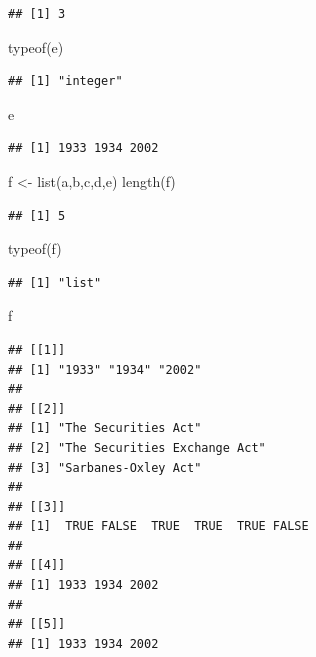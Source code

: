 \documentclass[
]{book}
\newenvironment{Shaded}{\begin{snugshade}}{\end{snugshade}}
\newcommand{\FunctionTok}[1]{\textcolor[rgb]{0.00,0.00,0.00}{#1}}
\newcommand{\NormalTok}[1]{#1}
\newcommand{\OtherTok}[1]{\textcolor[rgb]{0.56,0.35,0.01}{#1}}
\begin{document}
\begin{verbatim}
## [1] 3
\end{verbatim}

\begin{Shaded}
\begin{Highlighting}[]
\FunctionTok{typeof}\NormalTok{(e)}
\end{Highlighting}
\end{Shaded}

\begin{verbatim}
## [1] "integer"
\end{verbatim}

\begin{Shaded}
\begin{Highlighting}[]
\NormalTok{e}
\end{Highlighting}
\end{Shaded}

\begin{verbatim}
## [1] 1933 1934 2002
\end{verbatim}

\begin{Shaded}
\begin{Highlighting}[]
\NormalTok{f }\OtherTok{\textless{}{-}} \FunctionTok{list}\NormalTok{(a,b,c,d,e)}
\FunctionTok{length}\NormalTok{(f)}
\end{Highlighting}
\end{Shaded}

\begin{verbatim}
## [1] 5
\end{verbatim}

\begin{Shaded}
\begin{Highlighting}[]
\FunctionTok{typeof}\NormalTok{(f)}
\end{Highlighting}
\end{Shaded}

\begin{verbatim}
## [1] "list"
\end{verbatim}

\begin{Shaded}
\begin{Highlighting}[]
\NormalTok{f}
\end{Highlighting}
\end{Shaded}

\begin{verbatim}
## [[1]]
## [1] "1933" "1934" "2002"
## 
## [[2]]
## [1] "The Securities Act"         
## [2] "The Securities Exchange Act"
## [3] "Sarbanes-Oxley Act"         
## 
## [[3]]
## [1]  TRUE FALSE  TRUE  TRUE  TRUE FALSE
## 
## [[4]]
## [1] 1933 1934 2002
## 
## [[5]]
## [1] 1933 1934 2002
\end{verbatim}
\end{document}
